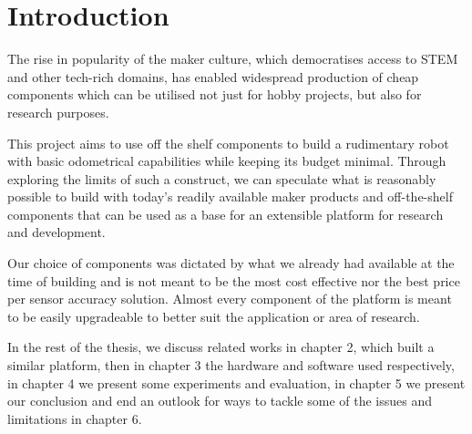 \documentclass[class=article, crop=false]{standalone}
\begin{document}
\chapter{Introduction}\label{cha:introduction}

The rise in popularity of the maker culture, which democratises access to STEM and other tech-rich domains, has enabled widespread production of cheap components which can be utilised not just for hobby projects, but also for research purposes.

This project aims to use off the shelf components to build a rudimentary robot with basic odometrical capabilities while keeping its budget minimal. Through exploring the limits of such a construct, we can speculate what is reasonably possible to build with today's readily available maker products and off-the-shelf components that can be used as a base for an extensible platform for research and development.

Our choice of components was dictated by what we already had available at the time of building and is not meant to be the most cost effective nor the best price per sensor accuracy solution. Almost every component of the platform is meant to be easily upgradeable to better suit the application or area of research.

In the rest of the thesis, we discuss related works in chapter 2, which built a similar platform, then in chapter 3 the hardware and software used respectively, in chapter 4 we present some experiments and evaluation, in chapter 5 we present our conclusion and end an outlook for ways to tackle some of the issues and limitations in chapter 6.
\end{document}

